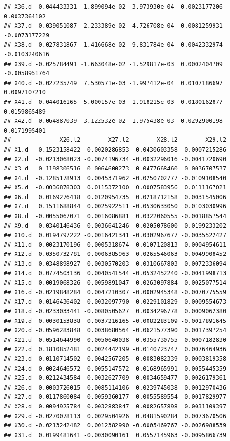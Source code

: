\documentclass[]{article}
\begin{document}
\begin{verbatim}
## X36.d -0.044433331 -1.899094e-02  3.973930e-04 -0.0023177206  0.0037364102
## X37.d -0.039051087  2.233389e-02  4.726708e-04 -0.0081259931 -0.0073177229
## X38.d -0.027831867  1.416668e-02  9.831784e-04  0.0042332974 -0.0103240616
## X39.d -0.025784491 -1.663048e-02 -1.529817e-03  0.0002404709 -0.0058951764
## X40.d -0.027235749  7.530571e-03 -1.997412e-04  0.0107186697  0.0097107210
## X41.d -0.044016165 -5.000157e-03 -1.918215e-03  0.0180162877  0.0159865489
## X42.d -0.064887039 -3.122532e-02 -1.975438e-03  0.0292900198  0.0171995401
##              X26.l2        X27.l2        X28.l2        X29.l2
## X1.d  -0.1523158422  0.0020286853 -0.0430603358  0.0007215286
## X2.d  -0.0213068023 -0.0074196734 -0.0032296016 -0.0041720690
## X3.d   0.1198306516 -0.0064600273 -0.0477668460 -0.0036707537
## X4.d  -0.1285178913  0.0045371962 -0.0250702777 -0.0109108540
## X5.d  -0.0036878303  0.0115372100  0.0007583956  0.0111167021
## X6.d   0.0169276418  0.0120954735  0.0218712158  0.0031545006
## X7.d   0.1511688844  0.0025922511 -0.0530633050  0.0103030996
## X8.d  -0.0055067071  0.0016086881  0.0322060555 -0.0018857544
## X9.d   0.0340146436 -0.0036641246 -0.0205078600 -0.0199233202
## X10.d  0.0194797222 -0.0016421341 -0.0302967677 -0.0035522427
## X11.d  0.0023170196 -0.0005318674  0.0107120813  0.0004954611
## X12.d  0.0350732781 -0.0006385963  0.0265546063  0.0049908452
## X13.d -0.0348898927  0.0030570203 -0.0310667803 -0.0072336094
## X14.d  0.0774503136  0.0040541544 -0.0532452240 -0.0041998713
## X15.d  0.0019068326 -0.0059891047 -0.0263097884 -0.0025077514
## X16.d -0.0219848284  0.0047210307 -0.0002945348 -0.0070775559
## X17.d -0.0146436402 -0.0032097790 -0.0229101829  0.0009554673
## X18.d -0.0233033441 -0.0080505627  0.0034296778  0.0009062380
## X19.d  0.0030153838  0.0037216165 -0.0082283109 -0.0017891645
## X20.d -0.0596283848  0.0038680564 -0.0621577390  0.0017397254
## X21.d -0.0514644990  0.0050640038 -0.0355730755  0.0007182830
## X22.d  0.1810852481  0.0024442199 -0.0140723747  0.0076464936
## X23.d -0.0110714502 -0.0042567205  0.0083082339 -0.0003819358
## X24.d -0.0024646572  0.0055147572  0.0168965991 -0.0055445359
## X25.d -0.0212434584 -0.0032627709  0.0034659477 -0.0026179361
## X26.d  0.0003726015  0.0085114106 -0.0239745038  0.0012970436
## X27.d -0.0117860084 -0.0059360177 -0.0055589554 -0.0017829977
## X28.d -0.0094925784  0.0032883847  0.0082657898  0.0031109397
## X29.d -0.0270078113  0.0029504926  0.0481590284  0.0073670506
## X30.d -0.0213242482  0.0012382990 -0.0005469767 -0.0026988539
## X31.d  0.0199481641 -0.0030090161  0.0557145963 -0.0095866739

\end{verbatim}
\end{document}
